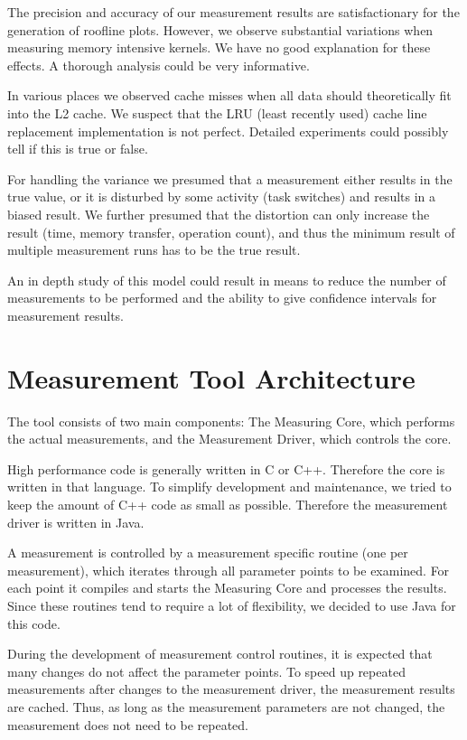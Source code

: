 \documentclass[a4paper,12pt]{report}
\begin{document}
The precision and accuracy of our measurement results are satisfactionary for
the generation of roofline plots. However, we observe substantial variations
when measuring memory intensive kernels. We have no good explanation for these
effects. A thorough analysis could be very informative.

In various places we observed cache misses when all data should theoretically
fit into the L2 cache. We suspect that the LRU (least recently used) cache line
replacement implementation is not perfect. Detailed experiments could possibly
tell if this is true or false.

For handling the variance we presumed that a measurement either results in the
true value, or it is disturbed by some activity (task switches) and results in a
biased result. We further presumed that the distortion can only increase the
result (time, memory transfer, operation count), and thus the minimum result of
multiple measurement runs has to be the true result.

An in depth study of this model could result in means to reduce the number of
measurements to be performed and the ability to give confidence intervals for
measurement results.

\clearpage
\appendix
\chapter{Measurement Tool Architecture}
The tool consists of two main components: The Measuring Core, which performs the
actual measurements, and the Measurement Driver, which controls the core.

High performance code is generally written in C or C++. Therefore the core is
written in that language. To simplify development and maintenance, we tried to
keep the amount of C++ code as small as possible. Therefore the measurement
driver is written in Java.

A measurement is controlled by a measurement specific routine (one per
measurement), which iterates through all parameter points to be examined. For
each point it compiles and starts the Measuring Core and processes the results.
Since these routines tend to require a lot of flexibility, we decided to use
Java for this code. 

During the development of measurement control routines, it is expected that many
changes do not affect the parameter points. To speed up repeated measurements
after changes to the measurement driver, the measurement results are cached.
Thus, as long as the measurement parameters are not changed, the measurement
does not need to be repeated.
\end{document}
